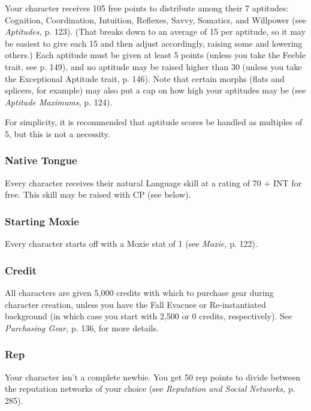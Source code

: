 Your character receives 105 free points to distribute 
among their 7 aptitudes: Cognition, Coordination, 
Intuition, Reflexes, Savvy, Somatics, and Willpower 
(see \textit{Aptitudes,} p. 123). (That breaks down to an average
of 15 per aptitude, so it may be easiest to give
each 15 and then adjust accordingly, raising some and 
lowering others.) Each aptitude must be given at least 
5 points (unless you take the Feeble trait, see p. 149), 
and no aptitude may be raised higher than 30 (unless 
you take the Exceptional Aptitude trait, p. 146). Note 
that certain morphs (flats and splicers, for example) 
may also put a cap on how high your aptitudes may 
be (see \textit{Aptitude Maximums,} p. 124).

For simplicity, it is recommended that aptitude 
scores be handled as multiples of 5, but this is not a 
necessity.

\subsubsection{Native Tongue}

Every character receives their natural Language skill 
at a rating of 70 + INT for free. This skill may be 
raised with CP (see below).

\subsubsection{Starting Moxie}

Every character starts off with a Moxie stat of 1 (see 
\textit{Moxie,} p. 122).

\subsubsection{Credit}

All characters are given 5,000 credits with which 
to purchase gear during character creation, unless 
you have the Fall Evacuee or Re-instantiated background
(in which case you start with 2,500 or 0
credits, respectively). See \textit{Purchasing Gear,} p. 136, 
for more details.

\subsubsection{Rep}

Your character isn't a complete newbie. You get 50 
rep points to divide between the reputation networks
of your choice (see \textit{Reputation and Social }
\textit{Networks,} p. 285).

